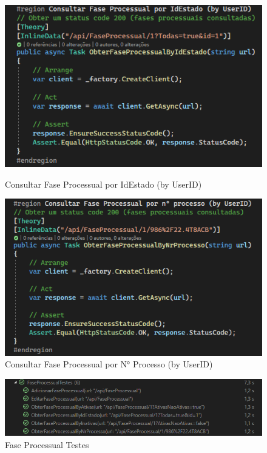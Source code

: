 \begin{figure}[!htbp]
\begin{minipage}[b]{0.4\textwidth}
    \includegraphics[width=\textwidth]{Figuras/TestesUnitarios/FaseProcessual/Consultar Fase Processual IdEstado.png}
    \caption{Consultar Fase Processual por IdEstado (by UserID)}
    \label{d.unitario}
  \end{minipage}
  \hfill
  \begin{minipage}[b]{0.4\textwidth}
    \includegraphics[width=\textwidth]{Figuras/TestesUnitarios/FaseProcessual/Consultar Fase Processual numero processo.png}
    \caption{Consultar Fase Processual por N° Processo (by UserID)}
    \label{d.unitario}
  \end{minipage}
\end{figure}

\begin{figure}[!tbp]
\centering
\includegraphics[width=1\textwidth]{Figuras/Testes/FaseProcessualTestes.png}
\caption{Fase Processual Testes}
\label{d.teste}
\end{figure}

